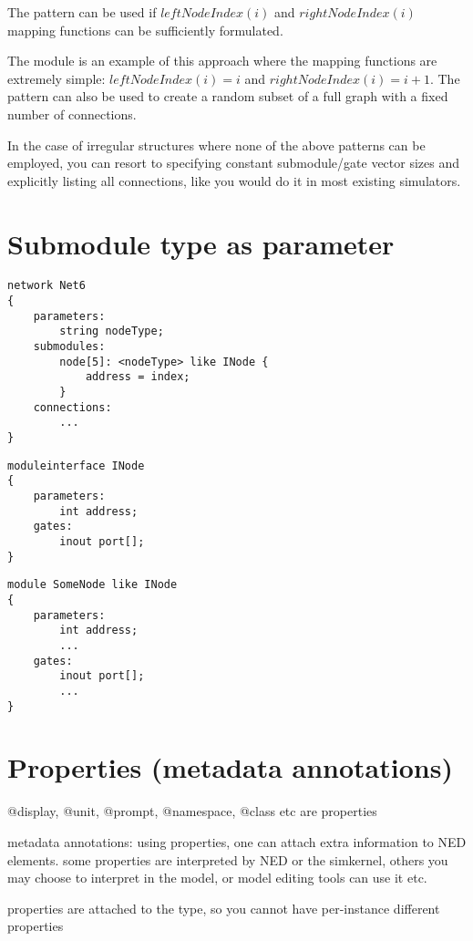 The pattern can be used if $leftNodeIndex(i)$ and $rightNodeIndex(i)$
mapping functions can be sufficiently formulated.

The  module is an example of this approach where the mapping
functions are extremely simple: $leftNodeIndex(i)=i$ and $rightNodeIndex(i) = i+1$.
The pattern can also be used to create a random subset of a full
graph with a fixed number of connections.

In the case of irregular structures where none of the above patterns
can be employed, you can resort to specifying constant submodule/gate
vector sizes and explicitly listing all connections, like you
would do it in most existing simulators.



\section{Submodule type as parameter}

\begin{Verbatim}
network Net6
{
    parameters:
        string nodeType;
    submodules:
        node[5]: <nodeType> like INode {
            address = index;
        }
    connections:
        ...
}
\end{Verbatim}

\begin{Verbatim}
moduleinterface INode
{
    parameters:
        int address;
    gates:
        inout port[];
}
\end{Verbatim}

\begin{Verbatim}
module SomeNode like INode
{
    parameters:
        int address;
        ...
    gates:
        inout port[];
        ...
}
\end{Verbatim}



\section{Properties (metadata annotations)}

@display, @unit, @prompt, @namespace, @class etc are properties

metadata annotations: using properties, one can attach extra information
to NED elements. some properties are interpreted by NED or the simkernel,
others you may choose to interpret in the model, or model editing tools
can use it etc.

properties are attached to the type, so you cannot have per-instance different
properties

